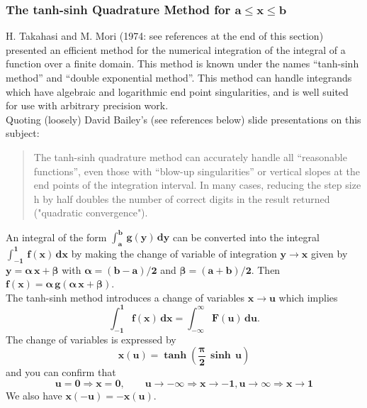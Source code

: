 \documentclass[12pt]{article}
\begin{document}
\subsubsection{The \textbf{tanh-sinh} Quadrature Method for $\mathbf{a \leq x \leq b}$} \label{tanh1}
H. Takahasi and M. Mori (1974: see references at the end of this section) presented an 
  efficient method for the
  numerical integration of the integral of a function over a finite domain.
This method is known under the names ``tanh-sinh method'' and ``double exponential method''.
This method can handle integrands which have algebraic and logarithmic end point
  singularities, and is well suited for use with arbitrary precision work.\\
  
\noindent Quoting (loosely) David Bailey's (see references below) slide presentations 
on this subject:
\begin{quote}
The tanh-sinh quadrature method can accurately handle all ``reasonable functions'',
  even those with ``blow-up singularities'' or vertical slopes at the end points
  of the integration interval.
In many cases, reducing the step size h by half doubles the number of correct
  digits in the result returned ("quadratic convergence").
\end{quote}  
An integral of the form $\mathbf{\int_{a}^{b}\,g(y)\,dy}$ can be converted into the integral
  $\mathbf{\int_{-1}^{1}\,f(x)\,dx}$ by making the change of variable of integration
  $\mathbf{y \rightarrow x }$ given by $\mathbf{y = \boldsymbol{\alpha}\,x + \boldsymbol{\beta}}$
  with $\mathbf{\boldsymbol{\alpha} = (b - a)/2}$ and $\mathbf{\boldsymbol{\beta} = (a + b)/2}$.
Then $\mathbf{f(x) = \boldsymbol{\alpha}\,g(\boldsymbol{\alpha}\,x + \boldsymbol{\beta}) }$.\\

\noindent The tanh-sinh method introduces a change of variables
  $\mathbf{x \rightarrow u}$ which implies
\begin{equation}
\mathbf{\int_{-1}^{1} f(x)\,dx = \int_{-\infty}^{\infty} F(u)\,du. }
\end{equation}
The change of variables is expressed by
\begin{equation}
\mathbf{ x(u) = \boldsymbol{\tanh} \left( \frac{ \boldsymbol{\pi} }{2}\, \boldsymbol{\sinh} \,u \right) }
\end{equation}
and you can confirm that
\begin{equation}
 \mathbf{u=0 \Rightarrow x = 0 , \qquad u \rightarrow -\infty  \Rightarrow  x \rightarrow -1  ,
  u \rightarrow \infty  \Rightarrow  x \rightarrow 1 }
\end{equation}
We also have $\mathbf{x(-u) = - x(u)}$.\\
\end{document}
